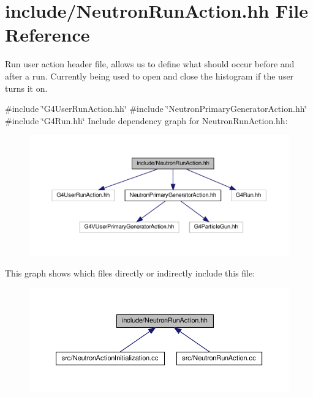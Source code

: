 \hypertarget{NeutronRunAction_8hh}{}\section{include/\+Neutron\+Run\+Action.hh File Reference}
\label{NeutronRunAction_8hh}


Run user action header file, allows us to define what should occur before and after a run. Currently being used to open and close the histogram if the user turns it on.  


{\ttfamily \#include \char`\"{}G4\+User\+Run\+Action.\+hh\char`\"{}}\newline
{\ttfamily \#include \char`\"{}Neutron\+Primary\+Generator\+Action.\+hh\char`\"{}}\newline
{\ttfamily \#include \char`\"{}G4\+Run.\+hh\char`\"{}}\newline
Include dependency graph for Neutron\+Run\+Action.\+hh\+:
\nopagebreak
\begin{figure}[H]
\begin{center}
\leavevmode
\includegraphics[width=350pt]{NeutronRunAction_8hh__incl}
\end{center}
\end{figure}
This graph shows which files directly or indirectly include this file\+:
\nopagebreak
\begin{figure}[H]
\begin{center}
\leavevmode
\includegraphics[width=350pt]{NeutronRunAction_8hh__dep__incl}
\end{center}
\end{figure}

